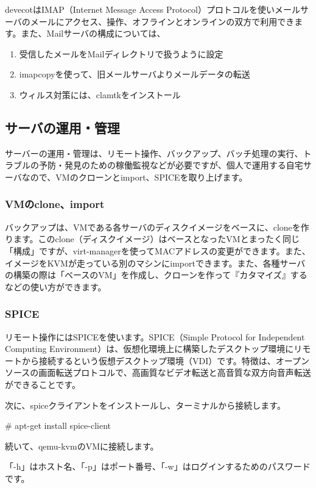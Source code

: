\documentclass[mingoth,a4paper]{jsarticle}
\begin{document}
devecotはIMAP（Internet Message Access Protocol）プロトコルを使いメールサーバのメールにアクセス、操作、オフラインとオンラインの双方で利用できます。また、Mailサーバの構成については、
\begin{enumerate}
\item 受信したメールをMailディレクトリで扱うように設定
\item imapcopyを使って、旧メールサーバよりメールデータの転送
\item ウィルス対策には、clamtkをインストール
\end{enumerate}

\subsection{サーバの運用・管理}
サーバーの運用・管理は、リモート操作、バックアップ、バッチ処理の実行、トラブルの予防・発見のための稼働監視などが必要ですが、個人で運用する自宅サーバなので、VMのクローンとimport、SPICEを取り上げます。

\subsubsection{VMのclone、import}
バックアップは、VMである各サーバのディスクイメージをベースに、cloneを作ります。このclone（ディスクイメージ）はベースとなったVMとまったく同じ「構成」ですが、virt-managerを使ってMACアドレスの変更ができます。また、イメージをKVMが走っている別のマシンにimportできます。また、各種サーバの構築の際は「ベースのVM」を作成し、クローンを作って『カタマイズ』するなどの使い方ができます。

\subsubsection{SPICE}
リモート操作にはSPICEを使います。SPICE（Simple Protocol for Independent Computing Environment）は、仮想化環境上に構築したデスクトップ環境にリモートから接続するという仮想デスクトップ環境（VDI）です。特徴は、オープンソースの画面転送プロトコルで、高画質なビデオ転送と高音質な双方向音声転送ができることです。

次に、spiceクライアントをインストールし、ターミナルから接続します。
\begin{commandline}
# apt-get install spice-client
\end{commandline}
続いて、qemu-kvmのVMに接続します。
「-h」はホスト名、「-p」はポート番号、「-w」はログインするためのパスワードです。
\end{document}
